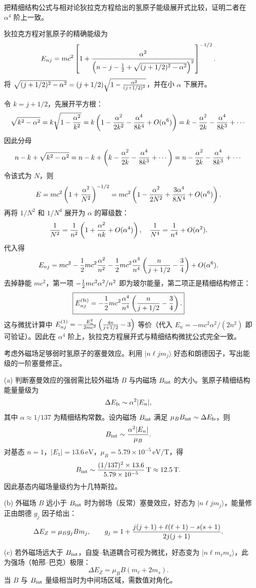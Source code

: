 \begin{question}
把精细结构公式与相对论狄拉克方程给出的氢原子能级展开式比较，证明二者在 $\alpha^4$ 阶上一致。
\end{question}
\begin{solution}
狄拉克方程对氢原子的精确能级为
\[
E_{nj}=mc^2\left[1+{\alpha^2\over\left(n-j-{1\over2}+\sqrt{(j+1/2)^2-\alpha^2}\right)^2}\right]^{-1/2}.
\]
将 $\sqrt{(j+1/2)^2-\alpha^2}=(j+1/2)\sqrt{1-{\alpha^2\over(j+1/2)^2}}$，并在小 $\alpha$ 下展开。

令 $k=j+1/2$，先展开平方根：
\[
\sqrt{k^2-\alpha^2}=k\sqrt{1-{\alpha^2\over k^2}}
=k\left(1-{\alpha^2\over2k^2}-{\alpha^4\over8k^4}+O(\alpha^6)\right)
=k-{\alpha^2\over2k}-{\alpha^4\over8k^3}+\cdots
\]
因此分母
\[
n-k+\sqrt{k^2-\alpha^2} = n-k+\left(k-{\alpha^2\over2k}-{\alpha^4\over8k^3}+\cdots\right)
=n-{\alpha^2\over2k}-{\alpha^4\over8k^3}+\cdots
\]
令该式为 $N$，则
\[
E = mc^2\left(1+{\alpha^2\over N^2}\right)^{-1/2}
= mc^2\left(1-{\alpha^2\over2N^2}+{3\alpha^4\over8N^4}+O(\alpha^6)\right).
\]
再将 $1/N^2$ 和 $1/N^4$ 展开为 $\alpha$ 的幂级数：
\[
{1\over N^2} = {1\over n^2}\left(1+{\alpha^2\over nk}+O(\alpha^4)\right),\quad
{1\over N^4} = {1\over n^4}+O(\alpha^2).
\]
代入得
\[
E_{nj}=mc^2-{1\over2}mc^2{\alpha^2\over n^2}
-{1\over2}mc^2{\alpha^4\over n^4}\left({n\over j+1/2}-{3\over4}\right)+O(\alpha^6).
\]
去掉静能 $mc^2$，第一项 $-{1\over2}mc^2\alpha^2/n^2$ 即为玻尔能量，第二项正是精细结构修正：
\[
\boxed{E_{nj}^{\text{(fs)}}=-{1\over2}mc^2{\alpha^4\over n^4}\left({n\over j+1/2}-{3\over4}\right).}
\]
这与微扰计算中 $E_{nj}^{(1)}=-{E_n^2\over2mc^2}\left({4n\over j+1/2}-3\right)$ 等价（代入 $E_n=-mc^2\alpha^2/(2n^2)$ 即可验证）。因此在 $\alpha^4$ 阶上，狄拉克方程展开式与精细结构微扰公式完全一致。
\end{solution}

\begin{question}
考虑外磁场足够弱时氢原子的塞曼效应。利用 $|n\ell jm_j\rangle$ 好态和朗德因子，写出能级的一阶塞曼修正。
\end{question}
\begin{solution}
(a) 判断塞曼效应的强弱需比较外磁场 $B$ 与内磁场 $B_{\rm int}$ 的大小。氢原子精细结构能量量级为
\[
\Delta E_{\rm fs}\sim \alpha^2 |E_n|,
\]
其中 $\alpha\approx1/137$ 为精细结构常数。设内磁场 $B_{\rm int}$ 满足 $\mu_B B_{\rm int}\sim\Delta E_{\rm fs}$，则
\[
B_{\rm int}\sim {\alpha^2|E_n|\over\mu_B}.
\]
对基态 $n=1$，$|E_1|=13.6\,\mathrm{eV}$，$\mu_B=5.79\times10^{-5}\,\mathrm{eV/T}$，得
\[
B_{\rm int}\sim {(1/137)^2\times13.6\over5.79\times10^{-5}}\,\mathrm{T}
\approx 12.5\,\mathrm{T}.
\]
因此基态内磁场量级约为十几特斯拉。

(b) 外磁场 $B$ 远小于 $B_{\rm int}$ 时为弱场（反常）塞曼效应，好态为 $|n\ell j m_j\rangle$，能量修正由朗德 $g_j$ 因子给出：
\[
\Delta E_Z = \mu_B g_j B m_j,\qquad
g_j=1+{j(j+1)+\ell(\ell+1)-s(s+1)\over2j(j+1)}.
\]

(c) 若外磁场远大于 $B_{\rm int}$，自旋--轨道耦合可视为微扰，好态变为 $|n\ell m_\ell m_s\rangle$，此为强场（帕邢--巴克）极限：
\[
\Delta E_Z = \mu_B B(m_\ell+2m_s).
\]
当 $B$ 与 $B_{\rm int}$ 量级相当时为中间场区域，需数值对角化。
\end{solution}

